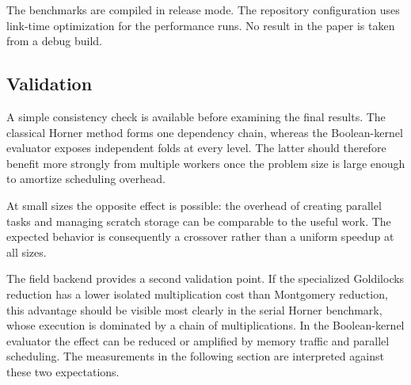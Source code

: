 The benchmarks are compiled in release mode.  The repository configuration
uses link-time optimization for the performance runs.  No result in the
paper is taken from a debug build.

\subsection{Validation}
\label{sec:validation}

A simple consistency check is available before examining the final results.
The classical Horner method forms one dependency chain, whereas the
Boolean-kernel evaluator exposes independent folds at every level.  The
latter should therefore benefit more strongly from multiple workers once
the problem size is large enough to amortize scheduling overhead.

At small sizes the opposite effect is possible: the overhead of creating
parallel tasks and managing scratch storage can be comparable to the useful
work.  The expected behavior is consequently a crossover rather than a
uniform speedup at all sizes.

The field backend provides a second validation point.  If the
specialized Goldilocks reduction has a lower isolated multiplication cost
than Montgomery reduction, this advantage should be visible most clearly in
the serial Horner benchmark, whose execution is dominated by a chain of
multiplications.  In the Boolean-kernel evaluator the effect can be reduced
or amplified by memory traffic and parallel scheduling.  The measurements
in the following section are interpreted against these two expectations.
